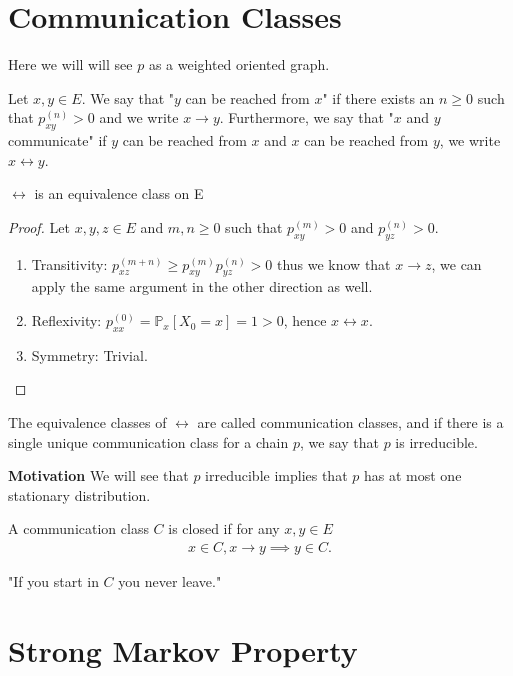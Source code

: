 \section{Communication Classes}
Here we will will see $p$ as a weighted oriented graph.
\begin{defn}
	Let $x,y \in E$. We say that "$y$ can be reached from $ x$" if there exists an $n \geq 0$ such that  $p_{xy}^{(n)}>0$ and we write $x \to y$. Furthermore, we say that "$x$ and $y $ communicate"  if $y$ can be reached from $x$ and $x$ can be reached from $y$, we write $x  \leftrightarrow y$.
\end{defn}

\begin{prop}[]
	$\leftrightarrow$ is an equivalence class on E
\end{prop}
\begin{proof}
	Let $x,y,z \in E$ and $m,n \geq 0$ such that $p_{xy}^{(m)}>0$ and $p_{yz}^{(n)}>0$.
\begin{enumerate}
	\item Transitivity: $p_{xz}^{(m+n)} \geq p_{xy}^{(m)}p_{yz}^{(n)} >0$ thus we know that $x\rightarrow z$, we can apply the same argument in the other direction as well. 
	\item Reflexivity: $p_{xx}^{(0)} = \mathbb{P}_{x} \left[ X_0 = x \right] =1>0$, hence $ x \leftrightarrow x$. 
	\item Symmetry: Trivial.
\end{enumerate}
\end{proof}


\begin{defn}
	The equivalence classes of $ \leftrightarrow $ are called communication classes, and if there is a single unique communication class for a chain $p$, we say that $p$ is irreducible.
\end{defn}

\noindent
\textbf{Motivation} We will see that $p$ irreducible implies that $p$ has at most one stationary distribution.

\begin{defn}
	A communication class $C$ is closed if for any $x,y \in E$
\begin{align}
 x \in C, x \to y \implies y \in C.
\end{align}
\end{defn}
"If you start in $C$ you never leave."

\section{Strong Markov Property}
	
